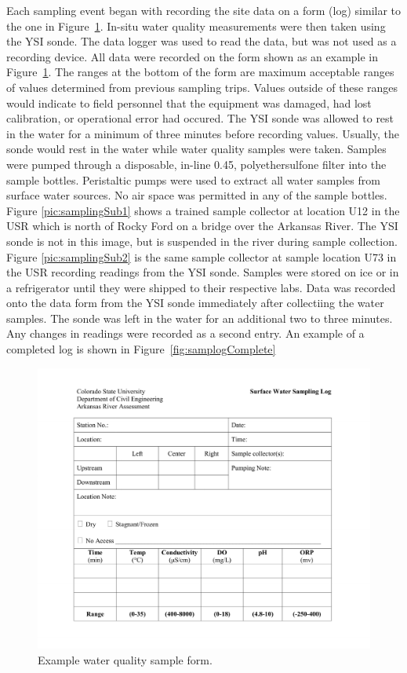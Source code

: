 Each sampling event began with recording the site data on a form (log) similar to the one in Figure~\ref{fig:samplog}.  In-situ water quality measurements were then taken using the YSI sonde.  The data logger was used to read the data, but was not used as a recording device.  All data were recorded on the form shown as an example in Figure~\ref{fig:samplog}.  The ranges at the bottom of the form are maximum acceptable ranges of values determined from previous sampling trips.  Values outside of these ranges would indicate to field personnel that the equipment was damaged, had lost calibration, or operational error had occured.  The YSI sonde was allowed to rest in the water for a minimum of three minutes before recording values.  Usually, the sonde would rest in the water while water quality samples were taken.  Samples were pumped through a disposable, in-line \SI{0.45}{\micron}, polyethersulfone filter into the sample bottles.  Peristaltic pumps were used to extract all water samples from surface water sources.  No air space was permitted in any of the sample bottles.  Figure \ref{pic:samplingSub1} shows a trained sample collector at location U12 in the USR which is north of Rocky Ford on a bridge over the Arkansas River.  The YSI sonde is not in this image, but is suspended in the river during sample collection.  Figure \ref{pic:samplingSub2} is the same sample collector at sample location U73 in the USR recording readings from the YSI sonde.  Samples were stored on ice or in a refrigerator until they were shipped to their respective labs.  Data was recorded onto the data form from the YSI sonde immediately after collectiing the water samples.  The sonde was left in the water for an additional two to three minutes.  Any changes in readings were recorded as a second entry.  An example of a completed log is shown in Figure~\ref{fig:samplogComplete}

\begin{figure}[htbp]
	\centering
	\includegraphics[width=6in]{Figures/SampleLog}
	\caption[Example water quality sample form.]{Example water quality sample form.}
	\label{fig:samplog}
\end{figure}


